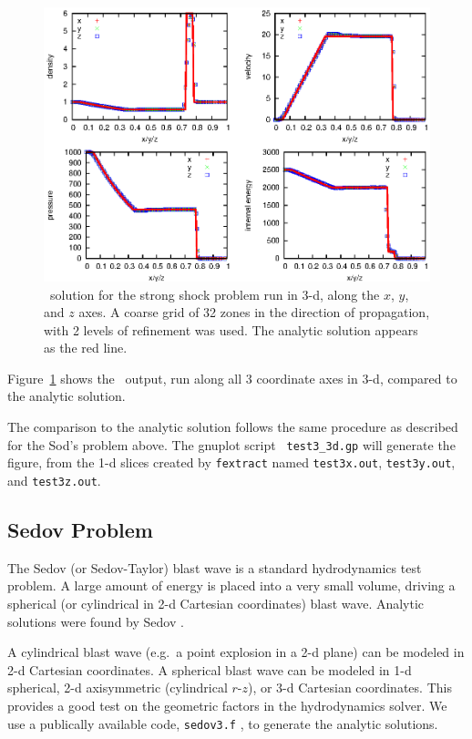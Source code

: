 \begin{figure}[t]
\centering
\includegraphics[width=5.0in]{test3_3d}
\caption{\label{fig:test3} \castro\ solution for the strong shock
  problem run in 3-d, along the $x$, $y$, and $z$ axes.  A coarse grid
  of 32 zones in the direction of propagation, with 2 levels of
  refinement was used.  The analytic solution appears as the red
  line.}
\end{figure}

Figure~\ref{fig:test3} shows the \castro\ output, run along all 3
coordinate axes in 3-d, compared to the analytic solution.  

The comparison to the analytic solution follows the same procedure as
described for the Sod's problem above.  The gnuplot script {\tt
  test3\_3d.gp} will generate the figure, from the 1-d slices created by
{\tt fextract} named {\tt test3x.out}, {\tt test3y.out}, and {\tt test3z.out}.


\subsection{Sedov Problem}

The Sedov (or Sedov-Taylor) blast wave is a standard hydrodynamics
test problem.  A large amount of energy is placed into a very small
volume, driving a spherical (or cylindrical in 2-d Cartesian
coordinates) blast wave.  Analytic solutions were found by Sedov
\cite{sedov:1959}.  

A cylindrical blast wave (e.g.\ a point explosion in a 2-d plane) can
be modeled in 2-d Cartesian coordinates.  A spherical blast wave can
be modeled in 1-d spherical, 2-d axisymmetric (cylindrical $r$-$z$), or 3-d
Cartesian coordinates.  This provides a good test on the geometric
factors in the hydrodynamics solver.
We use a publically available code, {\tt sedov3.f}
\cite{timmes_sedov_code}, to generate the analytic solutions.

